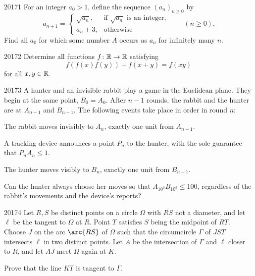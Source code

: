 
\begin{problem}{2017}{1}
For an integer $a_0>1$, define the sequence $(a_n)_{n\geq0}$ by
\[
    a_{n+1}=\begin{cases}
        \sqrt{a_n}, & \text{if $\sqrt{a_n}$ is an integer}, \\
        a_n+3, & \text{otherwise}
    \end{cases}
    \qquad(n\geq0).
\]
Find all $a_0$ for which some number $A$ occurs as $a_n$ for infinitely many $n$.
\end{problem}

\begin{problem}{2017}{2}
Determine all functions $f\colon\mathbb{R}\to\mathbb{R}$ satisfying
\[
    f(f(x)f(y))+f(x+y)=f(xy)
\]
for all $x, y\in\mathbb{R}$.
\end{problem}

\begin{problem}{2017}{3}
A hunter and an invisible rabbit play a game in the Euclidean plane. They begin at the same point, $B_0=A_0$. After $n-1$ rounds, the rabbit and the hunter are at $A_{n-1}$ and $B_{n-1}$. The following events take place in order in round $n$:
\begin{problemchoices}
    \item The rabbit moves invisibly to $A_n$, exactly one unit from $A_{n-1}$.
    \item A tracking device announces a point $P_n$ to the hunter, with the sole guarantee that $P_nA_n\leq1$.
    \item The hunter moves visibly to $B_n$, exactly one unit from $B_{n-1}$.
\end{problemchoices}
Can the hunter always choose her moves so that $A_{10^9}B_{10^9}\leq100$, regardless of the rabbit's movements and the device's reports?
\end{problem}

\begin{problem}{2017}{4}
Let $R, S$ be distinct points on a circle $\Omega$ with $\overline{RS}$ not a diameter, and let $\ell$ be the tangent to $\Omega$ at $R$. Point $T$ satisfies $S$ being the midpoint of $RT$. Choose $J$ on the arc $\arc{RS}$ of $\Omega$ such that the circumcircle $\Gamma$ of $JST$ intersects $\ell$ in two distinct points. Let $A$ be the intersection of $\Gamma$ and $\ell$ closer to $R$, and let $AJ$ meet $\Omega$ again at $K$.

Prove that the line $KT$ is tangent to $\Gamma$.
\end{problem}

